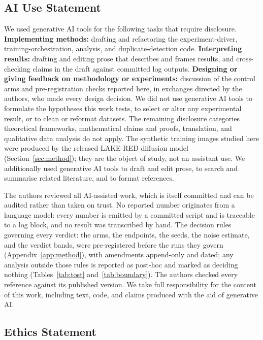 \documentclass{article}
\begin{document}
\subsection*{AI Use Statement}
We used generative AI tools for the following tasks that require disclosure. \textbf{Implementing
methods:} drafting and refactoring the experiment-driver, training-orchestration, analysis, and
duplicate-detection code. \textbf{Interpreting results:} drafting and editing prose that describes
and frames results, and cross-checking claims in the draft against committed log outputs.
\textbf{Designing or giving feedback on methodology or experiments:} discussion of the control arms
and pre-registration checks reported here, in exchanges directed by the authors, who made every
design decision. We did not use generative AI tools to formulate the hypotheses this work tests, to
select or alter any experimental result, or to clean or reformat datasets. The remaining disclosure
categories theoretical frameworks, mathematical claims and proofs, translation, and qualitative
data analysis do not apply. The synthetic training images studied here were produced by the
released LAKE-RED diffusion model (Section~\ref{sec:method}); they are the object of study, not an
assistant use. We additionally used generative AI tools to draft and edit prose, to search and
summarise related literature, and to format references.

The authors reviewed all AI-assisted work, which is itself committed and can be audited rather than
taken on trust. No reported number originates from a language model: every number is emitted by a
committed script and is traceable to a log block, and no result was transcribed by hand. The
decision rules governing every verdict: the arms, the endpoints, the seeds, the noise estimate,
and the verdict bands, were pre-registered before the runs they govern
(Appendix~\ref{app:method}), with amendments append-only and dated; any analysis outside those rules
is reported as post-hoc and marked as deciding nothing (Tables~\ref{tab:tost}
and~\ref{tab:boundary}). The authors checked every reference against its published version. We take
full responsibility for the content of this work, including text, code, and claims produced with the
aid of generative AI.

\subsection*{Ethics Statement}
\end{document}
